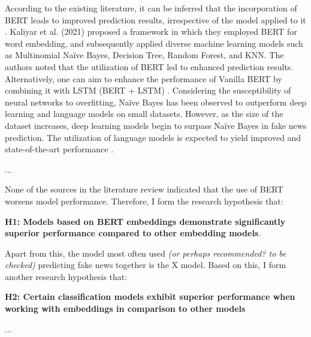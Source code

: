 According to the existing literature, it can be inferred that the incorporation of BERT leads to improved prediction results, irrespective of the model applied to it \autocite{Kaliyar2021}. Kaliyar et al. (2021) proposed a framework in which they employed BERT for word embedding, and subsequently applied diverse machine learning models such as Multinomial Naïve Bayes, Decision Tree, Random Forest, and KNN. The authors noted that the utilization of BERT led to enhanced prediction results. Alternatively, one can aim to enhance the performance of Vanilla BERT by combining it with LSTM (BERT + LSTM) \autocite{Rai2022}. 
Considering the susceptibility of neural networks to overfitting, Naïve Bayes has been observed to outperform deep learning and language models on small datasets. However, as the size of the dataset increases, deep learning models begin to surpass Naïve Bayes in fake news prediction. The utilization of language models is expected to yield improved and state-of-the-art performance \autocite{Khan2021}.

...

None of the sources in the literature review indicated that the use of BERT worsens model performance. Therefore, I form the research hypothesis that:
\vspace{0.2cm}

\noindent\textbf{H1: Models based on BERT embeddings demonstrate significantly superior performance compared to other embedding models}.
\vspace{0.2cm}

Apart from this, the model most often used \textit{(or perhaps recommended? to be checked)} predicting fake news together is the X model. Based on this, I form another research hypothesis that:
\vspace{0.2cm}

\noindent\textbf{H2: Certain classification models exhibit superior performance when working with embeddings in comparison to other models}
\vspace{0.2cm}

...

